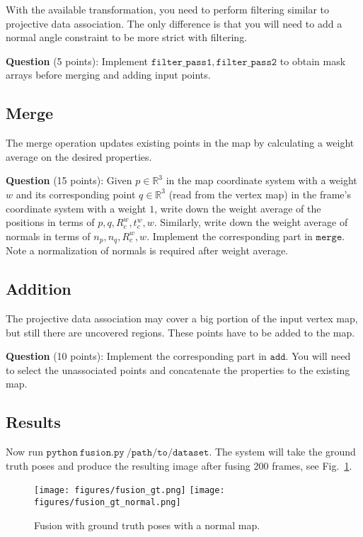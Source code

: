 \documentclass[12pt, a4paper]{article}
\begin{document}
With the available transformation, you need to perform filtering similar to projective data association. The only difference is that you will need to add a normal angle constraint to be more strict with filtering.

\textbf{Question} (5 points): Implement $\mathtt{filter\_pass1, filter\_pass2}$ to obtain mask arrays before merging and adding input points.

\subsection{Merge}
The merge operation updates existing points in the map by calculating a weight average on the desired properties.

\textbf{Question} (15 points): Given $p\in \mathbb{R}^3$ in the map coordinate system with a weight $w$ and its corresponding point $q \in \mathbb{R}^3$ (read from the vertex map) in the frame's coordinate system with a weight $1$, write down the weight average of the positions in terms of $p, q, R_c^w, t_c^w, w$. Similarly, write down the weight average of normals in terms of $n_p, n_q, R_c^w, w$. Implement the corresponding part in $\mathtt{merge}$. Note a normalization of normals is required after weight average.

\subsection{Addition}
The projective data association may cover a big portion of the input vertex map, but still there are uncovered regions. These points have to be added to the map.

\textbf{Question} (10 points): Implement the corresponding part in $\mathtt{add}$. You will need to select the unassociated points and concatenate the properties to the existing map.

\subsection{Results}
Now run $\mathtt{python~fusion.py~/path/to/dataset}$. The system will take the ground truth poses and produce the resulting image after fusing 200 frames, see Fig.~\ref{fig:fusion-gt}.
\begin{figure}
    \texttt{[image: figures/fusion\_gt.png]}
    \texttt{[image: figures/fusion\_gt\_normal.png]}
    \caption{Fusion with ground truth poses with a normal map.}\label{fig:fusion-gt}
\end{figure}
\end{document}
